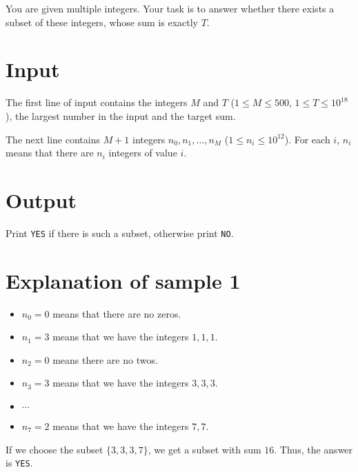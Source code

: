 You are given multiple integers. Your task is to answer whether there exists a subset of these integers, whose
sum is exactly $T$.

\section*{Input}
The first line of input contains the integers $M$ and $T$ ($1 \leq M \leq 500$, $1 \leq T \leq 10^{18}$),
the largest number in the input and the target sum.

The next line contains $M+1$ integers $n_0, n_1, \dots, n_M$ ($1 \leq n_i \leq 10^{12}$). For each $i$,
$n_i$ means that there are $n_i$ integers of value $i$.

\section*{Output}
Print \texttt{YES} if there is such a subset, otherwise print \texttt{NO}.

\section*{Explanation of sample 1}
\begin{itemize}
  \item $n_0=0$ means that there are no zeros.
  \item $n_1=3$ means that we have the integers $1, 1, 1$.
  \item $n_2=0$ means there are no twos.
  \item $n_3=3$ means that we have the integers $3,3,3$.
  \item $\cdots$
  \item $n_7=2$ means that we have the integers $7,7$.
\end{itemize}

If we choose the subset $\{3,3,3,7\}$, we get a subset with sum $16$. Thus, the answer is \texttt{YES}.
